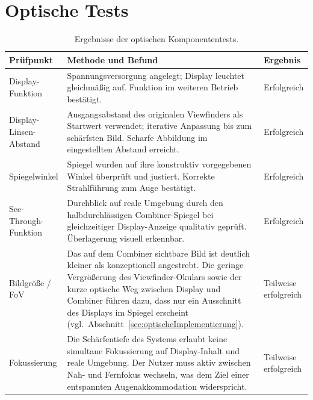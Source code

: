\chapter{Optische Tests}
\label{apx:optischetests}
\begin{table}[htbp]
  \centering
  \caption{Ergebnisse der optischen Komponententests.}
  \begin{tabularx}{\textwidth}{@{} l X l @{}}
    \toprule
    \textbf{Prüfpunkt} & \textbf{Methode und Befund} & \textbf{Ergebnis} \\
    \midrule
    Display-Funktion &
      Spannungsversorgung angelegt; Display leuchtet gleichmäßig auf.
      Funktion im weiteren Betrieb bestätigt. &
      Erfolgreich \\
    \addlinespace
    Display-Linsen-Abstand &
      Ausgangsabstand des originalen Viewfinders als Startwert verwendet;
      iterative Anpassung bis zum schärfsten Bild.
      Scharfe Abbildung im eingestellten Abstand erreicht. &
      Erfolgreich \\
    \addlinespace
    Spiegelwinkel &
      Spiegel wurden auf ihre
      konstruktiv vorgegebenen Winkel überprüft und justiert.
      Korrekte Strahlführung zum Auge bestätigt. &
      Erfolgreich \\
    \addlinespace
    See-Through-Funktion &
      Durchblick auf reale Umgebung durch den halbdurchlässigen
      Combiner-Spiegel bei gleichzeitiger Display-Anzeige qualitativ
      geprüft. Überlagerung visuell erkennbar. &
      Erfolgreich \\
    \addlinespace
    Bildgröße / FoV &
      Das auf dem Combiner sichtbare Bild ist deutlich kleiner als
      konzeptionell angestrebt. Die geringe Vergrößerung des
      Viewfinder-Okulars sowie der kurze optische Weg zwischen
      Display und Combiner führen dazu, dass nur ein
      Ausschnitt des Displays im Spiegel erscheint
      (vgl.~Abschnitt~\ref{sec:optischeImplementierung}). &
      Teilweise erfolgreich \\
    \addlinespace
    Fokussierung &
      Die Schärfentiefe des Systems erlaubt keine simultane Fokussierung
      auf Display-Inhalt und reale Umgebung. Der Nutzer muss aktiv
      zwischen Nah- und Fernfokus wechseln, was dem Ziel einer
      entspannten Augenakkommodation widerspricht. &
      Teilweise erfolgreich \\
    \bottomrule
  \end{tabularx}
\end{table}

